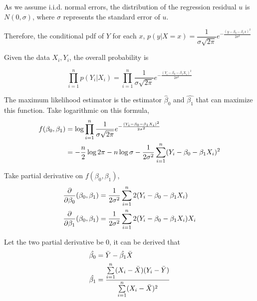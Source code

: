 As we assume i.i.d. normal errors,
the distribution of the regression residual $u$ is $N(0, \sigma)$,
where $\sigma$ represents the standard error of $u$.

Therefore, the conditional pdf of $Y$ for each $x$,
$p(y|X=x) = \dfrac{1}{\sigma \sqrt{2\pi}} e^{- \frac{
  ( y - \beta_0 - \beta_1 x )^2
}{
  2\sigma^2
}}$

Given the data $X_i, Y_i$, the overall probability is

\[
  \prod \limits_{i=1}^{n} p(Y_i | X_i) = \prod \limits_{i=1}^{n}
  \dfrac{1}{\sigma \sqrt{2\pi}}
  e^{- \frac{
  ( Y_i - \beta_0 - \beta_1 X_i )^2
  }{
    2\sigma^2
  }}
\]

The maximum likelihood estimator is the estimator $\hat{\beta}_0$ and $\hat{\beta_1}$
that can maximize this function.
Take logarithmic on this formula,
\[
  \begin{aligned}
  f(\beta_0, \beta_1) &= \log \prod \limits_{i=1}^{n}
  \dfrac{1}{\sigma \sqrt{2\pi}}
  e^{- \frac{
  ( Y_i - \beta_0 - \beta_1 X_i )^2
  }{
    2\sigma^2
  }} \\
  &= - \dfrac{n}{2} \log 2\pi - n \log \sigma
  - \dfrac{1}{2\sigma^2} \sum \limits _{i=1}^{n} ( Y_i - \beta_0 - \beta_1 X_i )^2
  \end{aligned}
\]

Take partial derivative on $f(\beta_0, \beta_1)$,
\[
  \begin{aligned}
    \dfrac{\partial}{\partial \beta_0}(\beta_0, \beta_1) &=
     \dfrac{1}{2\sigma^2} \sum \limits _{i=1}^{n} 2(Y_i - \beta_0 - \beta_1 X_i) \\
    \dfrac{\partial}{\partial \beta_1}(\beta_0, \beta_1) &=
     \dfrac{1}{2\sigma^2} \sum \limits _{i=1}^{n} 2(Y_i - \beta_0 - \beta_1 X_i) X_i
  \end{aligned}
\]

Let the two partial derivative be $0$,
it can be derived that
\[
  \begin{aligned}
    \hat{\beta_0} &= \bar{Y} - \hat{\beta_1} \bar{X} \\
    \hat{\beta_1} &= \dfrac{
      \sum \limits _{i=1}^{n} (X_i - \bar{X}) (Y_i - \bar{Y})
    }{
      \sum \limits _{i=1}^{n} (X_i - \bar{X})^2
    }
  \end{aligned}
\]
